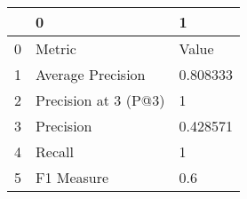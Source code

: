 \begin{tabular}{lll}
\toprule
{} &                     0 &         1 \\
\midrule
0 &                Metric &     Value \\
1 &     Average Precision &  0.808333 \\
2 &  Precision at 3 (P@3) &         1 \\
3 &             Precision &  0.428571 \\
4 &                Recall &         1 \\
5 &            F1 Measure &       0.6 \\
\bottomrule
\end{tabular}
